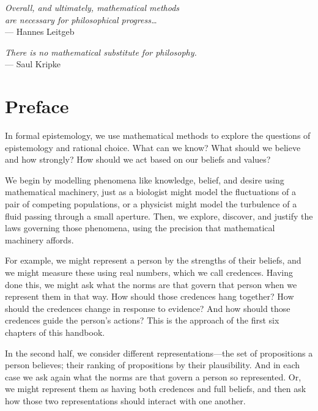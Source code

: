 

\begin{flushright}
    \textit{Overall, and ultimately, mathematical methods\\
    are necessary for philosophical progress\ldots\\}
    \smallskip
    {\small --- Hannes Leitgeb}

    \bigskip

    \textit{There is no mathematical substitute for philosophy.\\}
    \smallskip
    {\small --- Saul Kripke}
\end{flushright}

\bigskip

\begingroup
\let\clearpage\relax
\let\cleardoublepage\relax
\let\cleardoublepage\relax
\chapter*{Preface}

In formal epistemology, we use mathematical methods to explore the questions of epistemology and rational choice. What can we know? What should we believe and how strongly? How should we act based on our beliefs and values?

We begin by modelling phenomena like knowledge, belief, and desire using mathematical machinery, just as a biologist might model the fluctuations of a pair of competing populations, or a physicist might model the turbulence of a fluid passing through a small aperture. Then, we explore, discover, and justify the laws governing those phenomena, using the precision that mathematical machinery affords.

For example, we might represent a person by the strengths of their beliefs, and we might measure these using real numbers, which we call credences. Having done this, we might ask what the norms are that govern that person when we represent them in that way. How should those credences hang together? How should the credences change in response to evidence? And how should those credences guide the person’s actions? This is the approach of the first six chapters of this handbook.

In the second half, we consider different representations---the set of propositions a person believes; their ranking of propositions by their plausibility. And in each case we ask again what the norms are that govern a person so represented. Or, we might represent them as having both credences and full beliefs, and then ask how those two representations should interact with one another.

